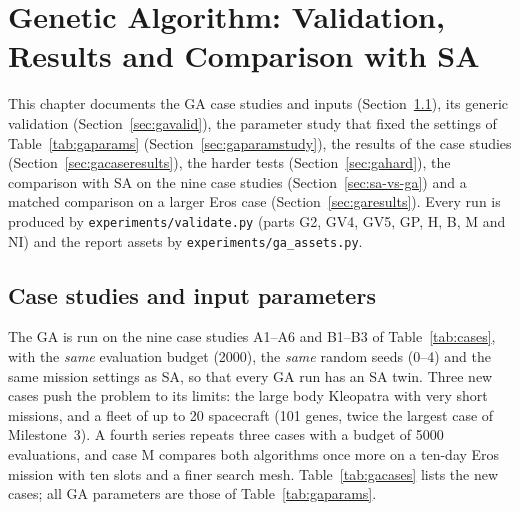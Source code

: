 \chapter{Genetic Algorithm: Validation, Results and Comparison with SA}
\label{ch:garesults}

This chapter documents the \ac{GA} case studies and inputs (Section~\ref{sec:gacases}), its generic
validation (Section~\ref{sec:gavalid}), the parameter study that fixed the settings of
Table~\ref{tab:gaparams} (Section~\ref{sec:gaparamstudy}), the results of the case studies
(Section~\ref{sec:gacaseresults}), the harder tests (Section~\ref{sec:gahard}), the comparison with
\ac{SA} on the nine case studies (Section~\ref{sec:sa-vs-ga}) and a matched comparison on a larger
Eros case (Section~\ref{sec:garesults}). Every run is produced by \texttt{experiments/validate.py}
(parts G2, GV4, GV5, GP, H, B, M and NI) and the report assets by \texttt{experiments/ga\_assets.py}.

\section{Case studies and input parameters}
\label{sec:gacases}

The \ac{GA} is run on the nine case studies A1--A6 and B1--B3 of Table~\ref{tab:cases}, with the
\emph{same} evaluation budget (2000), the \emph{same} random seeds (0--4) and the same mission
settings as \ac{SA}, so that every \ac{GA} run has an \ac{SA} twin. Three new cases push the problem
to its limits: the large body Kleopatra with very short missions, and a fleet of up to 20 spacecraft
(101 genes, twice the largest case of Milestone~3). A fourth series repeats three cases with a budget
of 5000 evaluations, and case M compares both algorithms once more on a ten-day Eros mission with
ten slots and a finer search mesh. Table~\ref{tab:gacases} lists the new cases; all \ac{GA}
parameters are those of Table~\ref{tab:gaparams}.

